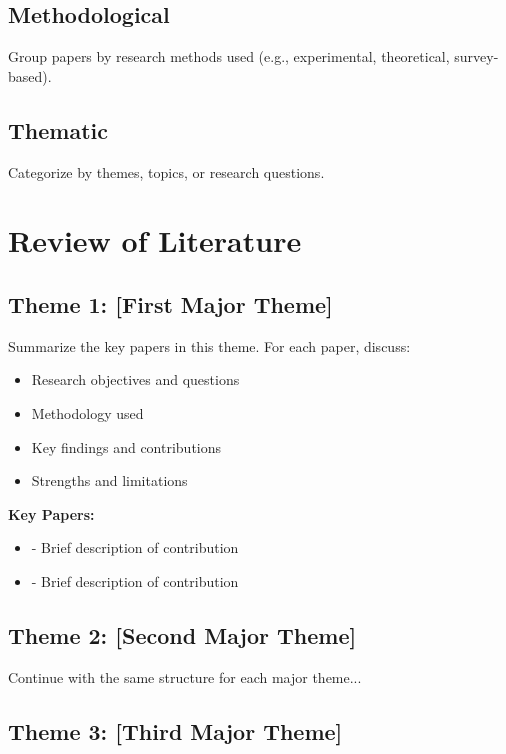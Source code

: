 \documentclass[11pt,a4paper]{article}
\begin{document}
\subsection{Methodological}
Group papers by research methods used (e.g., experimental, theoretical, survey-based).

\subsection{Thematic}
Categorize by themes, topics, or research questions.

\section{Review of Literature}
\label{sec:review}

\subsection{Theme 1: [First Major Theme]}
\label{subsec:theme1}

Summarize the key papers in this theme. For each paper, discuss:
\begin{itemize}
    \item Research objectives and questions
    \item Methodology used
    \item Key findings and contributions
    \item Strengths and limitations
\end{itemize}

\textbf{Key Papers:}
\begin{itemize}
    \item \cite{example2024} - Brief description of contribution
    \item \cite{sample2023} - Brief description of contribution
\end{itemize}

\subsection{Theme 2: [Second Major Theme]}
\label{subsec:theme2}

Continue with the same structure for each major theme...

\subsection{Theme 3: [Third Major Theme]}
\label{subsec:theme3}
\end{document}
